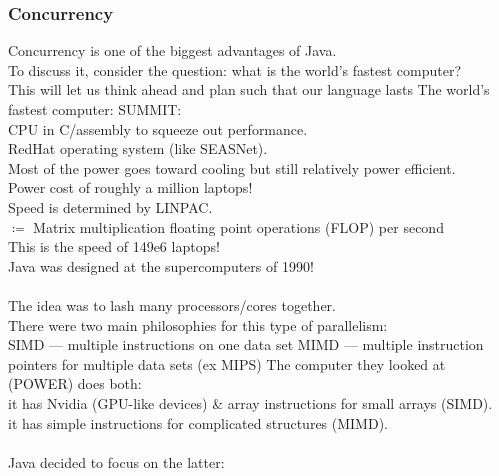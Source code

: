 \documentclass[../../lecture_notes.tex]{subfiles}
\begin{document}
\subsubsection*{Concurrency}
Concurrency is one of the biggest advantages of Java.\\
To discuss it, consider the question: what is the world’s fastest computer?\\
\indent This will let us think ahead and plan such that our language lasts
The world’s fastest computer: SUMMIT:\\
	\indent CPU in C/assembly to squeeze out performance.\\
	\indent RedHat operating system (like SEASNet).\\
	\indent Most of the power goes toward cooling but still relatively power efficient.\\
	\indent Power cost of roughly a million laptops!\\
	\indent Speed is determined by LINPAC.\\
		\indent \indent $\coloneqq$ Matrix multiplication floating point operations (FLOP) per second\\
	\indent This is the speed of 149e6 laptops!\\
Java was designed at the supercomputers of 1990!\\
\\
The idea was to lash many processors/cores together.\\
There were two main philosophies for this type of parallelism:\\
	\indent SIMD — multiple instructions on one data set
	\indent MIMD — multiple instruction pointers for multiple data sets (ex MIPS)
The computer they looked at (POWER) does both:\\
	\indent it has Nvidia (GPU-like devices) \& array instructions for small arrays (SIMD).\\
	\indent it has simple instructions for complicated structures (MIMD).\\
\\
Java decided to focus on the latter:
\end{document}
